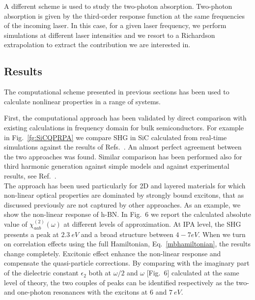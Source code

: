 A different scheme is used to study the two-photon absorption.  Two-photon absorption is given by the third-order response function at the same frequencies of the incoming laser. In this case, for a given laser frequency, we perform simulations at different laser intensities and we resort to a Richardson extrapolation to extract the contribution we are interested in.\cite{attaccalite2018two}

\subsection{Results}\label{sc:results}
The computational scheme presented in previous sections has been used to calculate nonlinear properties in a range of systems. 

First, the computational approach has been validated by direct comparison with existing calculations in frequency domain for bulk semiconductors. For example in Fig.~\ref{fg:SiCQPRPA} we compare SHG in SiC calculated from real-time simulations against the results of Refs.~\cite{PhysRevB.82.235201,PSSB.427.1984}. An almost perfect agreement between the two approaches was found. Similar comparison has been performed also for third harmonic generation against simple models and against experimental results, see Ref.~.\\
The approach has been used particularly for 2D and layered materials\cite{attaccalite2015strong,wei2019second,beach2020strain,mishra2020exciton,attaccalite2019second} for which non-linear optical properties are dominated by strongly bound excitons, that as discussed previously are not captured by other approaches. As an example, we show the non-linear response of h-BN. In Fig.~6
we report the calculated absolute value of $\chi^{(2)}_{aab} (\omega)$ at different levels of approximation. 
At IPA level, the SHG presents a peak at $2.3~eV$ and a broad structure between $4 - 7 eV$. When we turn on correlation effects using the full Hamiltonian, Eq.~\eqref{mbhamiltonian}, the results change completely.
Excitonic effect enhance the non-linear response and compensate the quasi-particle corrections. By comparing with the imaginary part of the dielectric constant $\epsilon_2$ both at $\omega/2$ and  $\omega$ [Fig.~6] calculated at the same level of theory, the two couples of peaks can be identified respectively as the two- and one-photon resonances with the excitons at $6$ and $7~eV$. 
